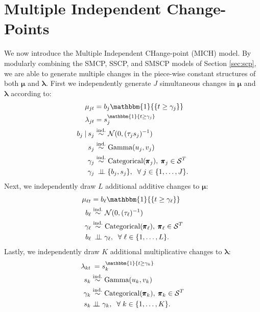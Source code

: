 \section{Multiple Independent Change-Points}
\label{sec:mich}

We now introduce the Multiple Independent CHange-point (MICH) model. By modularly combining the SMCP, SSCP, and SMSCP models of Section \ref{sec:scp}, we are able to generate multiple changes in the piece-wise constant structures of both $\pmb{\mu}$ and $\pmb{\lambda}$. First we independently generate $J$ simultaneous changes in $\pmb{\mu}$ and $\pmb{\lambda}$ according to:
\begin{align}
    \label{eq:mich-start}
    \mu_{jt} &= b_j \mathbbm{1}{\{t \geq \gamma_j\}} \\
    \lambda_{jt} &= s_j^{\mathbbm{1}\{t \geq \gamma_j\}} \\
    b_j \:|\: s_j &\overset{\text{ind.}}{\sim} \mathcal{N}(0,(\tau_js_j)^{-1}) \\
    s_j &\overset{\text{ind.}}{\sim} \text{Gamma}(u_j, v_j) \\
    \gamma_j &\overset{\text{ind.}}{\sim} \text{Categorical}(\pmb{\pi}_j),\;\pmb{\pi}_j \in \mathcal{S}^T \\
    \gamma_j &\:\indep \{b_j,s_j\},\; \sforall j \in \{1, \ldots, J\}.
\end{align}
Next, we independently draw $L$ additional additive changes to $\pmb{\mu}$:
\begin{align}
    \mu_{\ell t} &= b_\ell \mathbbm{1}{\{t \geq \gamma_\ell\}} \\
    b_\ell &\overset{\text{ind.}}{\sim} \mathcal{N}(0,(\tau_\ell)^{-1}) \\
    \gamma_\ell &\overset{\text{ind.}}{\sim} \text{Categorical}(\pmb{\pi}_\ell),\;\pmb{\pi}_\ell \in \mathcal{S}^T \\
    b_\ell &\:\indep \gamma_\ell,\; \sforall \ell \in \{1, \ldots, L\}.
\end{align}
Lastly, we independently draw $K$ additional multiplicative changes to $\pmb{\lambda}$:
\begin{align}
    \lambda_{kt} &\:= s_k^{\mathbbm{1}\{t \geq \gamma_k\}} \\
    s_k &\overset{\text{ind.}}{\sim} \text{Gamma}(u_k, v_k) \\
    \gamma_k &\overset{\text{ind.}}{\sim} \text{Categorical}(\pmb{\pi}_k),\;\pmb{\pi}_k \in \mathcal{S}^T\\
    s_k &\indep \gamma_k,\; \sforall k \in \{1, \ldots, K\}. \label{eq:mich-var-end}
\end{align}
